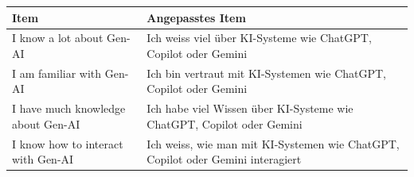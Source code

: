 \begin{center}
\begin{threeparttable}
\caption{Items für Konstrukt: FAM-TEC}
\label{tab:FAM-TEC}
\begin{tabularx}{\textwidth}{X X}
\toprule
\textbf{Item} & \textbf{Angepasstes Item} \\
\midrule
I know a lot about Gen-AI & Ich weiss viel über KI-Systeme wie ChatGPT, Copilot oder Gemini \\
I am familiar with Gen-AI & Ich bin vertraut mit KI-Systemen wie ChatGPT, Copilot oder Gemini \\
I have much knowledge about Gen-AI & Ich habe viel Wissen über KI-Systeme wie ChatGPT, Copilot oder Gemini \\
I know how to interact with Gen-AI & Ich weiss, wie man mit KI-Systemen wie ChatGPT, Copilot oder Gemini interagiert \\
\bottomrule
\end{tabularx}
\end{threeparttable}
\end{center}
\vspace{1em}